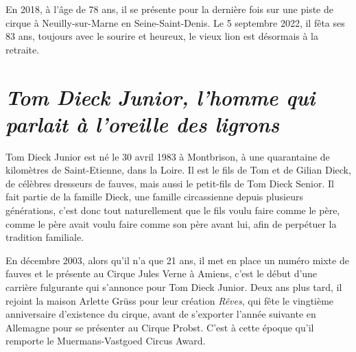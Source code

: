 En 2018, à l'âge de 78 ans, il se présente pour la dernière fois sur une piste de cirque à Neuilly-sur-Marne en Seine-Saint-Denis. Le 5 septembre 2022, il fêta ses 83 ans, toujours avec le sourire et heureux, le vieux lion est désormais à la retraite.

\section*{\textit{Tom Dieck Junior, l'homme qui parlait à l'oreille des ligrons}}
{}

Tom Dieck Junior est né le 30 avril 1983 à Montbrison, à une quarantaine de kilomètres de Saint-Etienne, dans la Loire. Il est le fils de Tom et de Gilian Dieck, de célèbres dresseurs de fauves, mais aussi le petit-fils de Tom Dieck Senior. Il fait partie de la famille Dieck, une famille circassienne depuis plusieurs générations, c'est donc tout naturellement que le fils voulu faire comme le père, comme le père avait voulu faire comme son père avant lui, afin de perpétuer la tradition familiale.

En décembre 2003, alors qu'il n’a que 21 ans, il met en place un numéro mixte de fauves et le présente au Cirque Jules Verne à Amiens, c'est le début d'une carrière fulgurante qui s'annonce pour Tom Dieck Junior. Deux ans plus tard, il rejoint la maison Arlette Grüss pour leur création \textit{Rêves}, qui fête le vingtième anniversaire d'existence du cirque, avant de s'exporter l'année suivante en Allemagne pour se présenter au Cirque Probst. C'est à cette époque qu'il remporte le Muermans-Vastgoed Circus Award.

